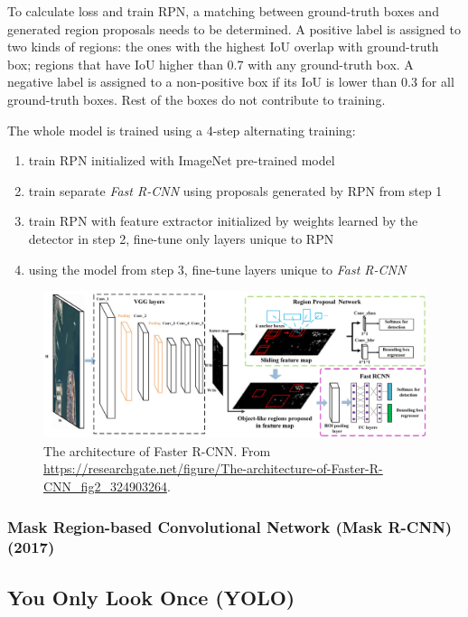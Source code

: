  To calculate loss and train RPN, a matching between ground-truth boxes and generated region proposals needs to be determined. A positive label is assigned to two kinds of regions: the ones with the highest IoU overlap with ground-truth box; regions that have IoU higher than 0.7 with any ground-truth box. A negative label is assigned to a non-positive box if its IoU is lower than 0.3 for all ground-truth boxes. Rest of the boxes do not contribute to training. 
 
 The whole model is trained using a 4-step alternating training:
 
 \begin{enumerate}
     \item train RPN initialized with ImageNet pre-trained model
     \item train separate \textit{Fast R-CNN} using proposals generated by RPN from step 1
     \item train RPN with feature extractor initialized by weights learned by the detector in step 2, fine-tune only layers unique to RPN
     \item using the model from step 3, fine-tune layers unique to \textit{Fast R-CNN}
 \end{enumerate}

     

 \begin{figure}
     \centering
     \includegraphics[width=\textwidth]{img/fasterrcnn}
     \caption{The architecture of Faster R-CNN. From \url{https://researchgate.net/figure/The-architecture-of-Faster-R-CNN\_fig2\_324903264}.}
     \label{fig:fasterrcnn}
 \end{figure}

\subsubsection{Mask Region-based Convolutional Network (Mask R-CNN) (2017)}
\cite{bib:maskrcnn}

\subsection*{You Only Look Once (YOLO)}

